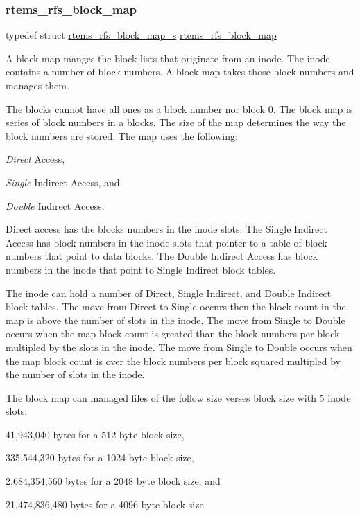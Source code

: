 \subsubsection{\texorpdfstring{rtems\_rfs\_block\_map}{rtems\_rfs\_block\_map}}
{\footnotesize\ttfamily typedef struct \mbox{\hyperlink{structrtems__rfs__block__map__s}{rtems\+\_\+rfs\+\_\+block\+\_\+map\+\_\+s}}  \mbox{\hyperlink{rtems-rfs-block_8h_af488270acef452a961e888bffdc3a7bf}{rtems\+\_\+rfs\+\_\+block\+\_\+map}}}

A block map manges the block lists that originate from an inode. The inode contains a number of block numbers. A block map takes those block numbers and manages them.

The blocks cannot have all ones as a block number nor block 0. The block map is series of block numbers in a blocks. The size of the map determines the way the block numbers are stored. The map uses the following\+:

\begin{DoxyItemize}
\item {\itshape Direct} Access, \item {\itshape Single} Indirect Access, and \item {\itshape Double} Indirect Access.\end{DoxyItemize}
Direct access has the blocks numbers in the inode slots. The Single Indirect Access has block numbers in the inode slots that pointer to a table of block numbers that point to data blocks. The Double Indirect Access has block numbers in the inode that point to Single Indirect block tables.

The inode can hold a number of Direct, Single Indirect, and Double Indirect block tables. The move from Direct to Single occurs then the block count in the map is above the number of slots in the inode. The move from Single to Double occurs when the map block count is greated than the block numbers per block multipled by the slots in the inode. The move from Single to Double occurs when the map block count is over the block numbers per block squared multipled by the number of slots in the inode.

The block map can managed files of the follow size verses block size with 5 inode slots\+:

\begin{DoxyItemize}
\item 41,943,040 bytes for a 512 byte block size, \item 335,544,320 bytes for a 1024 byte block size, \item 2,684,354,560 bytes for a 2048 byte block size, and \item 21,474,836,480 bytes for a 4096 byte block size. \end{DoxyItemize}


